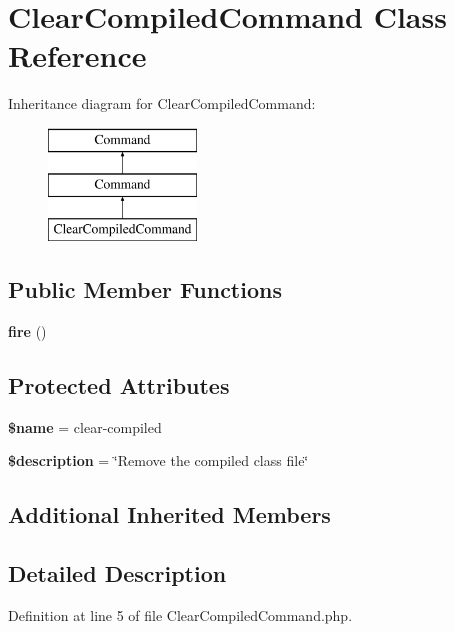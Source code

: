 \section{Clear\+Compiled\+Command Class Reference}
\label{class_illuminate_1_1_foundation_1_1_console_1_1_clear_compiled_command}
Inheritance diagram for Clear\+Compiled\+Command\+:\begin{figure}[H]
\begin{center}
\leavevmode
\includegraphics[height=3.000000cm]{class_illuminate_1_1_foundation_1_1_console_1_1_clear_compiled_command}
\end{center}
\end{figure}
\subsection*{Public Member Functions}
\begin{DoxyCompactItemize}
\item 
{\bf fire} ()
\end{DoxyCompactItemize}
\subsection*{Protected Attributes}
\begin{DoxyCompactItemize}
\item 
{\bf \$name} = \textquotesingle{}clear-\/compiled\textquotesingle{}
\item 
{\bf \$description} = \char`\"{}Remove the compiled class file\char`\"{}
\end{DoxyCompactItemize}
\subsection*{Additional Inherited Members}


\subsection{Detailed Description}


Definition at line 5 of file Clear\+Compiled\+Command.\+php.



